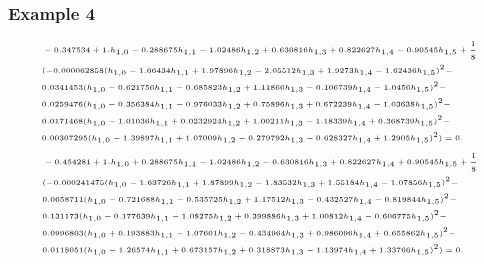 \documentclass{beamer}
\begin{document}
\begin{frame}\frametitle{Example 4}
	\justifying
	\begin{equation}\label{14c}
	\tiny
	\begin{aligned}
	&-0.347534+1. h_{1,0}-0.288675 h_{1,1}-1.02486 h_{1,2}+0.630816 h_{1,3}+0.822627 h_{1,4}-0.90545 h_{1,5}+\frac{1}{8}\\
	&(-0.000062858( h_{1,0}-1.66434 h_{1,1}+1.97896 h_{1,2}-2.05512 h_{1,3}+1.9273 h_{1,4}-1.62436 h_{1,5})^{2}-\\
	&0.0341453(h_{1,0}-0.621756 h_{1,1}-0.685823 h_{1,2}+1.11866 h_{1,3}-0.106739 h_{1,4}-1.0456 h_{1,5})^{2}-\\
	&0.0259476(h_{1,0}-0.356384 h_{1,1}-0.976033 h_{1,2}+0.75896 h_{1,3}+0.672239 h_{1,4}-1.03638 h_{1,5})^{2}-\\
	&0.0171468(h_{1,0}-1.01036 h_{1,1}+0.0232924 h_{1,2}+1.00211 h_{1,3}-1.18339 h_{1,4}+0.368739 h_{1,5})^{2}-\\
	&0.00307295(h_{1,0}-1.39897 h_{1,1}+1.07009 h_{1,2}-0.279792 h_{1,3}-0.628327 h_{1,4}+1.2905 h_{1,5})^{2})=0.
	\end{aligned}
	\end{equation}
	\begin{equation}\label{14d}
	\tiny
	\begin{aligned}
	&-0.454281+1. h_{1,0}+0.288675 h_{1,1}-1.02486 h_{1,2}-0.630816 h_{1,3}+0.822627 h_{1,4}+0.90545 h_{1,5}+\frac{1}{8}\\
	&(-0.000241475(h_{1,0}-1.63726 h_{1,1}+1.87899 h_{1,2}-1.83532 h_{1,3}+1.55184 h_{1,4}-1.07856 h_{1,5})^{2}-\\
	&0.0658711(h_{1,0}-0.721688 h_{1,1}-0.535725 h_{1,2}+1.17512 h_{1,3}-0.432527 h_{1,4}-0.819844 h_{1,5})^{2}-\\
	&0.131173(h_{1,0}-0.177639 h_{1,1}-1.08275 h_{1,2}+0.399886 h_{1,3}+1.00812 h_{1,4}-0.606775 h_{1,5})^{2}-\\
	&0.0996803(h_{1,0}+0.193883 h_{1,1}-1.07601 h_{1,2}-0.434964 h_{1,3}+0.986096 h_{1,4}+0.655862 h_{1,5})^{2}-\\
	&0.0118051(h_{1,0}-1.26574 h_{1,1}+0.673157 h_{1,2}+0.318873 h_{1,3}-1.13974 h_{1,4}+1.33766 h_{1,5})^{2})=0.
	\end{aligned}
	\end{equation}	
\end{frame}
\end{document}
